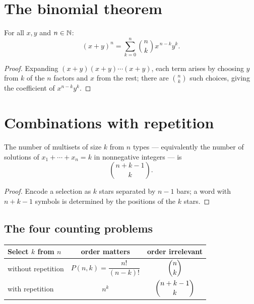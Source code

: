 \section{The binomial theorem}

\begin{theorem}\label{thm:binom}
For all $x, y$ and $n \in \mathbb{N}$:
\[
(x + y)^{n} = \sum_{k=0}^{n} \binom{n}{k} x^{\,n-k} y^{k}.
\]
\end{theorem}

\begin{proof}
Expanding $(x+y)(x+y)\cdots(x+y)$, each term arises by choosing $y$ from $k$
of the $n$ factors and $x$ from the rest; there are $\binom{n}{k}$ such
choices, giving the coefficient of $x^{n-k}y^{k}$.
\end{proof}

\section{Combinations with repetition}

\begin{theorem}\label{thm:stars}
The number of multisets of size $k$ from $n$ types --- equivalently the
number of solutions of $x_1 + \cdots + x_n = k$ in nonnegative integers ---
is
\[
\binom{n + k - 1}{k}.
\]
\end{theorem}

\begin{proof}
Encode a selection as $k$ stars separated by $n-1$ bars; a word with
$n + k - 1$ symbols is determined by the positions of the $k$ stars.
\end{proof}

\subsection{The four counting problems}

\begin{center}
\renewcommand{\arraystretch}{1.4}
\begin{tabular}{lcc}
\toprule
Select $k$ from $n$ & order matters & order irrelevant\\
\midrule
without repetition & $P(n,k) = \dfrac{n!}{(n-k)!}$ & $\dbinom{n}{k}$\\
with repetition & $n^{k}$ & $\dbinom{n+k-1}{k}$\\
\bottomrule
\end{tabular}
\end{center}

